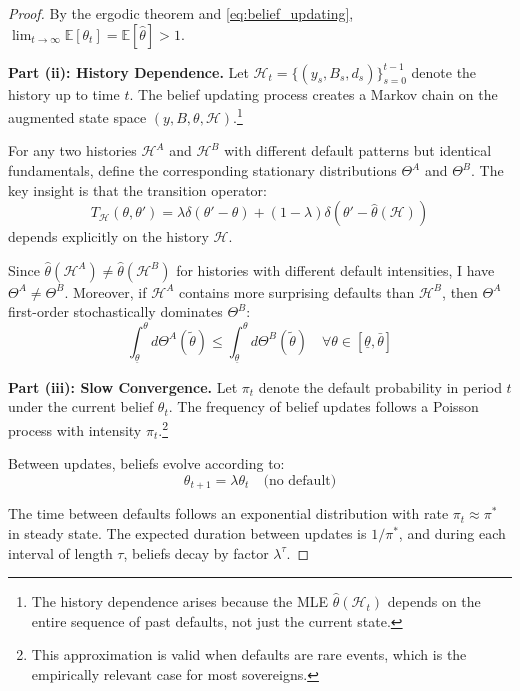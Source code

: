 \documentclass[12pt]{article}
\theoremstyle{plain}
\begin{document}
\begin{proof}
	By the ergodic theorem and \eqref{eq:belief_updating}, $\lim_{t \to \infty}
		\mathbb{E}[\theta_t] = \mathbb{E}[\hat{\theta}] > 1$.

	\textbf{Part (ii): History Dependence.}
	Let $\mathcal{H}_t = \{(y_s, B_s, d_s)\}_{s=0}^{t-1}$ denote the history up to time $t$. The belief updating process creates a Markov chain on the augmented state space $(y, B, \theta, \mathcal{H})$.\footnote{The history dependence arises because the MLE $\hat{\theta}(\mathcal{H}_t)$ depends on the entire sequence of past defaults, not just the current state.}

	For any two histories $\mathcal{H}^A$ and $\mathcal{H}^B$ with different
	default patterns but identical fundamentals, define the corresponding
	stationary distributions $\Theta^A$ and $\Theta^B$. The key insight is that the
	transition operator:
	\begin{equation}
		T_{\mathcal{H}}(\theta, \theta') = \lambda \delta(\theta' - \theta) + (1-\lambda) \delta(\theta' - \hat{\theta}(\mathcal{H}))
		\label{eq:transition_operator}
	\end{equation}
	depends explicitly on the history $\mathcal{H}$.

	Since $\hat{\theta}(\mathcal{H}^A) \neq \hat{\theta}(\mathcal{H}^B)$ for
	histories with different default intensities, I have $\Theta^A \neq \Theta^B$.
	Moreover, if $\mathcal{H}^A$ contains more surprising defaults than
	$\mathcal{H}^B$, then $\Theta^A$ first-order stochastically dominates
	$\Theta^B$:
	\begin{equation}
		\int_{\underline{\theta}}^{\theta} d\Theta^A(\tilde{\theta}) \leq \int_{\underline{\theta}}^{\theta} d\Theta^B(\tilde{\theta}) \quad \forall \theta \in [\underline{\theta}, \bar{\theta}] \label{eq:stochastic_dominance}
	\end{equation}

	\textbf{Part (iii): Slow Convergence.}
	Let $\pi_t$ denote the default probability in period $t$ under the current belief $\theta_t$. The frequency of belief updates follows a Poisson process with intensity $\pi_t$.\footnote{This approximation is valid when defaults are rare events, which is the empirically relevant case for most sovereigns.}

	Between updates, beliefs evolve according to:
	\begin{equation}
		\theta_{t+1} = \lambda \theta_t \quad \text{(no default)} \label{eq:belief_decay}
	\end{equation}

	The time between defaults follows an exponential distribution with rate $\pi_t
		\approx \pi^*$ in steady state. The expected duration between updates is
	$1/\pi^*$, and during each interval of length $\tau$, beliefs decay by factor
	$\lambda^\tau$.


\end{proof}
\end{document}
